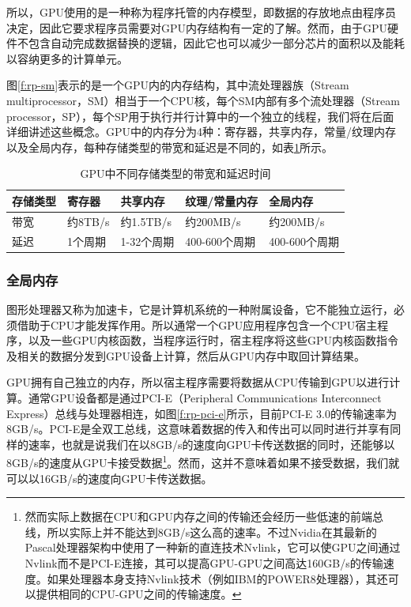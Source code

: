 所以，GPU使用的是一种称为程序托管的内存模型，即数据的存放地点由程序员决定，因此它要求程序员需要对GPU内存结构有一定的了解。然而，由于GPU硬件不包含自动完成数据替换的逻辑，因此它也可以减少一部分芯片的面积以及能耗以容纳更多的计算单元。

图\ref{f:rp-sm}表示的是一个GPU内的内存结构，其中流处理器族（Stream multiprocessor，SM）相当于一个CPU核，每个SM内部有多个流处理器（Stream processor，SP），每个SP用于执行并行计算中的一个独立的线程，我们将在后面详细讲述这些概念。GPU中的内存分为4种：寄存器，共享内存，常量/纹理内存以及全局内存，每种存储类型的带宽和延迟是不同的，如表\ref{t:rp-gpu-memory}所示。

\begin{table}
\caption{GPU中不同存储类型的带宽和延迟时间}
\label{t:rp-gpu-memory}

\begin{tabular}{p{}|p{}|p{}|p{}|p{}}
\hline 
   存储类型&寄存器&共享内存&纹理/常量内存&全局内存  \\
    \hline  
 带宽&约8TB/s&约1.5TB/s&约200MB/s&约200MB/s\\
 延迟&1个周期&1-32个周期&400-600个周期&400-600个周期\\
 \hline 
\end{tabular}
\end{table}





\subsubsection{全局内存}
图形处理器又称为加速卡，它是计算机系统的一种附属设备，它不能独立运行，必须借助于CPU才能发挥作用。所以通常一个GPU应用程序包含一个CPU宿主程序，以及一些GPU内核函数，当程序运行时，宿主程序将这些GPU内核函数指令及相关的数据分发到GPU设备上计算，然后从GPU内存中取回计算结果。

GPU拥有自己独立的内存，所以宿主程序需要将数据从CPU传输到GPU以进行计算。通常GPU设备都是通过PCI-E（Peripheral Communications Interconnect Express）总线与处理器相连，如图\ref{f:rp-pci-e}所示，目前PCI-E 3.0的传输速率为8GB/s。PCI-E是全双工总线，这意味着数据的传入和传出可以同时进行并享有同样的速率，也就是说我们在以8GB/s的速度向GPU卡传送数据的同时，还能够以8GB/s的速度从GPU卡接受数据\footnote{然而实际上数据在CPU和GPU内存之间的传输还会经历一些低速的前端总线，所以实际上并不能达到8GB/s这么高的速率。不过Nvidia在其最新的Pascal处理器架构\cite{a:PascalArchitectureWhitepaper}中使用了一种新的直连技术Nvlink，它可以使GPU之间通过Nvlink而不是PCI-E连接，其可以提高GPU-GPU之间高达160GB/s的传输速度。如果处理器本身支持Nvlink技术（例如IBM的POWER8处理器），其还可以提供相同的CPU-GPU之间的传输速度。}。然而，这并不意味着如果不接受数据，我们就可以以16GB/s的速度向GPU卡传送数据。

